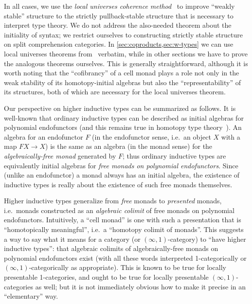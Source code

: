 \documentclass{amsart}
\begin{document}
In all cases, we use the \emph{local universes coherence method}~\cite{lw:localuniv} to improve ``weakly stable'' structure to the strictly pullback-stable structure that is necessary to interpret type theory.
We do not address the also-needed theorem about the initiality of syntax; we restrict ourselves to constructing strictly stable structure on split comprehension categories.
In \cref{sec:coproducts,sec:w-types} we can use local universes theorems from~\cite{lw:localuniv} verbatim, while in other sections we have to prove the analogous theorems ourselves.
This is generally straightforward, although it is worth noting that the ``cofibrancy'' of a cell monad plays a role not only in the weak stability of its homotopy-initial algebras but also the ``representability'' of its structures, both of which are necessary for the local universes theorem.

Our perspective on higher inductive types can be summarized as follows.
It is well-known that ordinary inductive types can be described as initial algebras for polynomial endofunctors (and this remains true in homotopy type theory~\cite{ags:it-hott}).
An algebra for an endofunctor $F$ (in the endofunctor sense, i.e.\ an object $X$ with a map $F X \to X$) is the same as an algebra (in the monad sense) for the \emph{algebraically-free monad} generated by $F$; thus ordinary inductive types are equivalently initial algebras for \emph{free monads on polynomial endofunctors}.
Since (unlike an endofunctor) a monad always has an initial algebra, the existence of inductive types is really about the existence of such free monads themselves.

Higher inductive types generalize from \emph{free} monads to \emph{presented} monads, i.e.\ monads constructed as an \emph{algebraic colimit} of free monads on polynomial endofunctors.
Intuitively, a ``cell monad'' is one with such a presentation that is ``homotopically meaningful'', i.e.\ a ``homotopy colimit of monads''.
This suggests a way to say what it means for a category (or $(\infty,1)$-category) to ``have higher inductive types'': that algebraic colimits of algebraically-free monads on polynomial endofunctors exist (with all these words interpreted 1-categorically or $(\infty,1)$-categorically as appropriate).
This is known to be true for locally presentable 1-categories, and ought to be true for locally presentable $(\infty,1)$-categories as well; but it is not immediately obvious how to make it precise in an ``elementary'' way.
\end{document}
